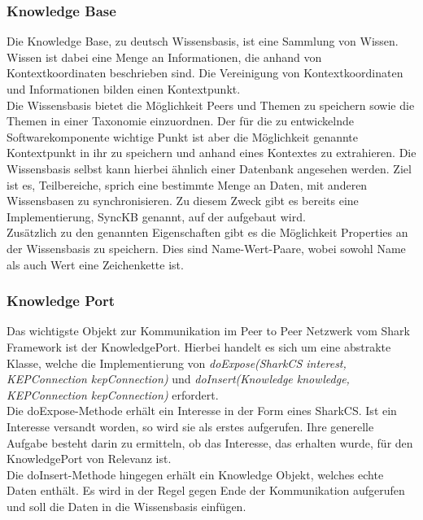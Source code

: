 \documentclass[a4paper]{article}
\begin{document}
	\subsubsection{Knowledge Base} 
	Die Knowledge Base, zu deutsch Wissensbasis, ist eine Sammlung von Wissen.
	Wissen ist dabei eine Menge an Informationen, die anhand von
	Kontextkoordinaten beschrieben sind. Die Vereinigung von Kontextkoordinaten
	und Informationen bilden einen Kontextpunkt.\\
	
	Die Wissensbasis bietet die Möglichkeit Peers und Themen zu speichern sowie
	die Themen in einer Taxonomie einzuordnen. Der für die zu entwickelnde
	Softwarekomponente wichtige Punkt ist aber die Möglichkeit genannte
	Kontextpunkt in ihr zu speichern und anhand eines Kontextes zu extrahieren.
	Die Wissensbasis selbst kann hierbei ähnlich einer Datenbank angesehen werden.
	Ziel ist es, Teilbereiche, sprich eine bestimmte Menge an Daten, mit
	anderen Wissensbasen zu synchronisieren. Zu diesem Zweck gibt es bereits eine
	Implementierung, SyncKB genannt, auf der aufgebaut wird. \\
	
	Zusätzlich zu den genannten Eigenschaften gibt es die Möglichkeit Properties
	an der Wissensbasis zu speichern. Dies sind Name-Wert-Paare, wobei sowohl Name 
	als auch Wert eine Zeichenkette ist.
	
	\subsubsection{Knowledge Port} 
	Das wichtigste Objekt zur Kommunikation im Peer to Peer Netzwerk vom Shark
	Framework ist der KnowledgePort. Hierbei handelt es  sich um eine abstrakte
	Klasse,	welche die Implementierung von \emph{doExpose(SharkCS interest,
	KEPConnection kepConnection)} und \emph{doInsert(Knowledge knowledge,
	KEPConnection kepConnection)} erfordert. \\
	
	\newpage
	Die doExpose-Methode erhält ein Interesse in der Form eines SharkCS. Ist
	ein Interesse versandt worden, so wird sie als erstes aufgerufen. Ihre 
	generelle Aufgabe besteht darin zu ermitteln, ob das Interesse, das erhalten
	wurde, für den KnowledgePort von Relevanz ist. \\
	
	Die doInsert-Methode hingegen erhält ein Knowledge Objekt, welches echte
	Daten enthält. Es wird in der Regel gegen Ende der Kommunikation aufgerufen
	und soll die Daten in die Wissensbasis einfügen. \\
	
\end{document}
